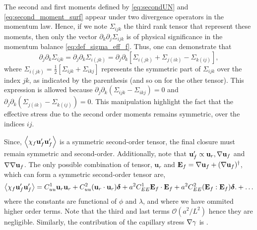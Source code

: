 The second and first moments defined by \ref{eq:secondUN} and \ref{eq:second_moment_surf} appear under two divergence operators in the momentum law. 
Hence, if we note $\Sigma_{ijk}$ the third rank tensor that represent these moments, then only the vector $\partial_k \partial_j\Sigma_{ijk}$ is of physical significance in the momentum balance \eqref{eq:def_sigma_eff_f}.
Thus, one can demonstrate that \citep{lhuillier1996contribution}
\begin{equation}
    \partial_j \partial_k \Sigma_{ijk}
    = \partial_j \partial_k \Sigma_{i(jk)}
    =
    \partial_j \partial_k \left[
        \Sigma_{i(jk)}
        + \Sigma_{j(ik)}
        - \Sigma_{k(ij)}
    \right],
    \label{eq:sym_proof}
\end{equation}
where $\Sigma_{i(jk)} = \frac{1}{2}[\Sigma_{ijk} + \Sigma_{ikj}]$ represents the symmetric part of $\Sigma_{ijk}$ over the index $jk$, as indicated by the parenthesis (and so on for the other tensor). 
This expression is allowed because $\partial_j \partial_k (\Sigma_{ijk} - \Sigma_{ikj}) = 0$ and $\partial_j \partial_k (\Sigma_{j(ik)} - \Sigma_{k(ij)}) = 0$. 
This manipulation highlight the fact that the effective stress due to the second order moments remains symmetric, over the indices $ij$. 

Since, $\left<\chi_f \textbf{u}_f'\textbf{u}_f'\right>$ is a symmetric second-order tensor, the final closure must remain symmetric and second-order.
Additionally, note that $\textbf{u}_f' \propto \textbf{u}_r, \mathbf{\nabla} \textbf{u}_f$ and $\mathbf{\nabla}\mathbf{\nabla} \textbf{u}_f$. 
The only possible combination of tensor, $\textbf{u}_{r}$ and $\textbf{E}_f= \mathbf{\nabla} \textbf{u}_f+(\mathbf{\nabla} \textbf{u}_f)^\dagger$, which can form a symmetric second-order tensor are, 
\begin{equation}
    \avg{\chi_f \textbf{u}_f' \textbf{u}_f'}
    =
    C_{uu}^1 \textbf{u}_{r} \textbf{u}_{r}
    + C_{uu}^2 (\textbf{u}_{r}\cdot  \textbf{u}_{r})\bm\delta
    +a^2 C_{EE}^1 \textbf{E}_f\cdot \textbf{E}_f 
    +  a^2 C_{EE}^2 (\textbf{E}_f : \textbf{E}_f)\bm\delta.
    + \ldots
    \label{eq:Reynolds_stress_functional_form}
\end{equation}
where the constants are functional of $\phi$ and $\lambda$, and where we have ommited higher order terms.
Note that the third and last terms $\mathcal{O}(a^2/L^2)$ hence they are negligible. 
Similarly, the contribution of the capillary  stress $\mathbf{\nabla}\gamma$ is . 


